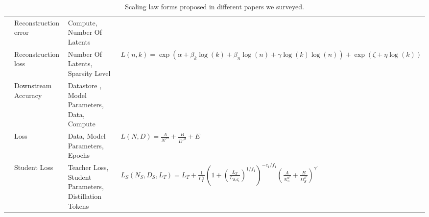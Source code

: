 \begin{table*}[htbp]
{\begin{tabular}{p{35mm} p{35mm} p{45mm} p{125mm}}
    \citet{circuits_nodate} & Reconstruction error & Compute, Number Of Latents &  \\
    \citet{gao_scaling_2024} & Reconstruction loss & Number Of Latents, Sparsity Level & \(L(n,k) = \exp(\alpha + \beta_k \log(k) + \beta_n \log(n) + \gamma \log(k)\log(n)) + \exp(\zeta + \eta \log(k))\) \\
    \citet{shao_scaling_2024} &  Downstream Accuracy   & Datastore , Model Parameters, Data, Compute    &  \\
    \citet{muennighoff_scaling_2023} & Loss & Data, Model Parameters, Epochs & \(L(N,D) = \frac{A}{N'^\alpha} + \frac{B}{D'^\beta} + E\) \\
    \citet{busbridge2025distillation} & Student Loss & Teacher Loss, Student Parameters, Distillation Tokens  & \(L_S(N_S,D_S,L_T) = L_T + \frac{1}{L_T^{c_0}} \left(1 + \left(\frac{L_T}{L_{S,d_1}}\right)^{1/f_1}\right)^{-c_1/f_1} \left(\frac{A}{N_S^{\alpha'}} + \frac{B}{D_S^{\beta'}}\right)^{\gamma'}\) \\
     \cline{1-4}
    \end{tabular}%
    }
    \caption{Scaling law forms proposed in different papers we surveyed.}
  \label{tab:database2}%
\end{table*}%
